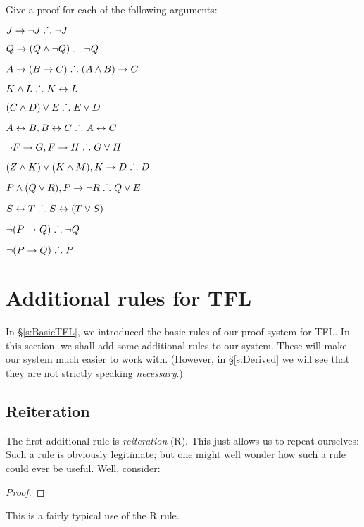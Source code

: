 \solutions
\problempart
\label{pr.solvedTFLproofs}
Give a proof for each of the following arguments:
\begin{earg}
\item $J\rightarrow\neg J \mathrel{\ldotp\dot{}\,\ldotp} \neg J$
\item $Q\rightarrow(Q\wedge\neg Q) \mathrel{\ldotp\dot{}\,\ldotp} \neg Q$
\item $A\rightarrow (B\rightarrow C) \mathrel{\ldotp\dot{}\,\ldotp} (A\wedge B)\rightarrow C$
\item $K\wedge L \mathrel{\ldotp\dot{}\,\ldotp} K\leftrightarrow L$
\item $(C\wedge D)\vee E \mathrel{\ldotp\dot{}\,\ldotp} E\vee D$
\item $A\leftrightarrow B, B\leftrightarrow C \mathrel{\ldotp\dot{}\,\ldotp} A\leftrightarrow C$
\item $\neg F\rightarrow G, F\rightarrow H \mathrel{\ldotp\dot{}\,\ldotp} G\vee H$
\item $(Z\wedge K) \vee (K\wedge M), K \rightarrow D \mathrel{\ldotp\dot{}\,\ldotp} D$
\item $P \wedge (Q\vee R), P\rightarrow \neg R \mathrel{\ldotp\dot{}\,\ldotp} Q\vee E$
\item $S\leftrightarrow T \mathrel{\ldotp\dot{}\,\ldotp} S\leftrightarrow (T\vee S)$
\item $\neg (P \rightarrow Q) \mathrel{\ldotp\dot{}\,\ldotp} \neg Q$
\item $\neg (P \rightarrow Q) \mathrel{\ldotp\dot{}\,\ldotp} P$
\end{earg}


\chapter{Additional rules for TFL}\label{s:Further}
In \S\ref{s:BasicTFL}, we introduced the basic rules of our proof system for TFL. In this section, we shall add some additional rules to our system. These will make our system much easier to work with. (However, in \S\ref{s:Derived} we will see that they are not strictly speaking \emph{necessary}.)

\section{Reiteration}
The first additional rule is \emph{reiteration} (R). This just allows us to repeat ourselves:
Such a rule is obviously legitimate; but one might well wonder how such a rule could ever be useful. Well, consider:
\begin{proof}
	\open
	\close
	\open
	\close
\end{proof}
This is a fairly typical use of the R rule.

